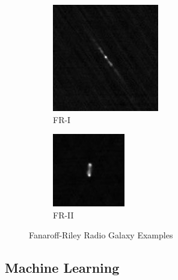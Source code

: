 \documentclass{article}
\begin{document}
\begin{figure}
    \centering
    \begin{subfigure}[b]{0.5\textwidth}
        \centering
        \includegraphics[width=0.7\linewidth]{FR1.jpg} 
        \caption{FR-I}
        \label{fig:subim1}
    \end{subfigure}%
    \begin{subfigure}[b]{0.5\textwidth}
        \centering
        \includegraphics[width=0.7\linewidth]{FR2.jpg}
        \caption{FR-II}
        \label{fig:subim2}
    \end{subfigure}
 
    \caption{Fanaroff-Riley Radio Galaxy Examples}
    \label{fig:image2}
\end{figure}

\subsection{\label{sec:level2}Machine Learning}
\end{document}

